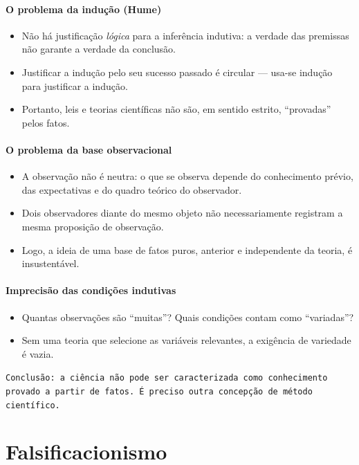 \documentclass[9pt,a4paper]{extarticle}
\newcommand{\impt}[1]{\textcolor{important}{#1}}
\begin{document}
\paragraph{O problema da indução (Hume)}
\begin{itemize}
    \item Não há justificação \emph{lógica} para a inferência indutiva: a verdade das premissas não garante a verdade da conclusão.
    \item Justificar a indução pelo seu sucesso passado é circular --- usa-se indução para justificar a indução.
    \item Portanto, \impt{leis e teorias científicas não são, em sentido estrito, ``provadas'' pelos fatos}.
\end{itemize}

\paragraph{O problema da base observacional}
\begin{itemize}
    \item \impt{A observação não é neutra}: o que se observa depende do conhecimento prévio, das expectativas e do quadro teórico do observador.
    \item Dois observadores diante do mesmo objeto não necessariamente registram a mesma proposição de observação.
    \item Logo, a ideia de uma base de fatos puros, anterior e independente da teoria, é insustentável.
\end{itemize}

\paragraph{Imprecisão das condições indutivas}
\begin{itemize}
    \item Quantas observações são ``muitas''? Quais condições contam como ``variadas''?
    \item Sem uma teoria que selecione as variáveis relevantes, a exigência de variedade é vazia.
\end{itemize}

\texttt{Conclusão: a ciência não pode ser caracterizada como conhecimento provado a partir de fatos. É preciso outra concepção de método científico.}

\section{Falsificacionismo}
\end{document}
